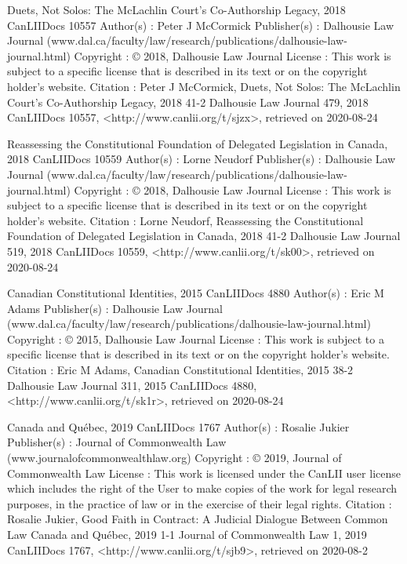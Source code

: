 Duets, Not Solos: The McLachlin Court’s Co-Authorship Legacy, 2018 CanLIIDocs 10557
Author(s) : 	Peter J McCormick
Publisher(s) : 	Dalhousie Law Journal (www.dal.ca/faculty/law/research/publications/dalhousie-law-journal.html)
Copyright : 	© 2018, Dalhousie Law Journal
License : 	This work is subject to a specific license that is described in its text or on the copyright holder's website.
Citation : 	Peter J McCormick, Duets, Not Solos: The McLachlin Court’s Co-Authorship Legacy, 2018 41-2 Dalhousie Law Journal 479, 2018 CanLIIDocs 10557, <http://www.canlii.org/t/sjzx>, retrieved on 2020-08-24



Reassessing the Constitutional Foundation of Delegated Legislation in Canada, 2018 CanLIIDocs 10559
Author(s) : 	Lorne Neudorf
Publisher(s) : 	Dalhousie Law Journal (www.dal.ca/faculty/law/research/publications/dalhousie-law-journal.html)
Copyright : 	© 2018, Dalhousie Law Journal
License : 	This work is subject to a specific license that is described in its text or on the copyright holder's website.
Citation : 	Lorne Neudorf, Reassessing the Constitutional Foundation of Delegated Legislation in Canada, 2018 41-2 Dalhousie Law Journal 519, 2018 CanLIIDocs 10559, <http://www.canlii.org/t/sk00>, retrieved on 2020-08-24



Canadian Constitutional Identities, 2015 CanLIIDocs 4880
Author(s) : 	Eric M Adams
Publisher(s) : 	Dalhousie Law Journal (www.dal.ca/faculty/law/research/publications/dalhousie-law-journal.html)
Copyright : 	© 2015, Dalhousie Law Journal
License : 	This work is subject to a specific license that is described in its text or on the copyright holder's website.
Citation : 	Eric M Adams, Canadian Constitutional Identities, 2015 38-2 Dalhousie Law Journal 311, 2015 CanLIIDocs 4880, <http://www.canlii.org/t/sk1r>, retrieved on 2020-08-24



Canada and Québec, 2019 CanLIIDocs 1767
Author(s) : 	Rosalie Jukier
Publisher(s) : 	Journal of Commonwealth Law (www.journalofcommonwealthlaw.org)
Copyright : 	© 2019, Journal of Commonwealth Law
License : 	This work is licensed under the CanLII user license which includes the right of the User to make copies of the work for legal research purposes, in the practice of law or in the exercise of their legal rights.
Citation : 	Rosalie Jukier, Good Faith in Contract: A Judicial Dialogue Between Common Law Canada and Québec, 2019 1-1 Journal of Commonwealth Law 1, 2019 CanLIIDocs 1767, <http://www.canlii.org/t/sjb9>, retrieved on 2020-08-2


